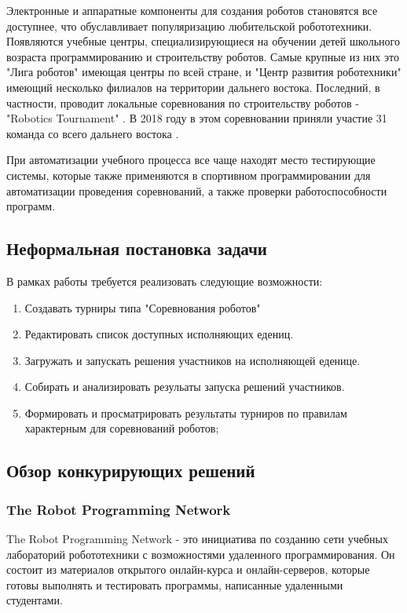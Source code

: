 \documentclass[a4paper,12pt]{article}
\begin{document}
Электронные и аппаратные компоненты для создания роботов становятся все доступнее, что обуславливает популяризацию любительской робототехники. Появляются учебные центры, специализирующиеся на обучении детей школьного возраста программированию и строительству роботов. Самые крупные из них это "Лига роботов" \cite{web:ligarobotov} имеющая центры по всей стране, и "Центр развития роботехники" \cite{web:robocentr} имеющий несколько филиалов на территории дальнего востока. Последний, в частности, проводит локальные соревнования по строительству роботов - "Robotics Tournament" \cite{web:robotournament}. В 2018 году в этом соревновании приняли участие 31 команда со всего дальнего востока \cite{web:robotournament-finals}.

При автоматизации учебного процесса все чаще находят место тестирующие системы, которые также применяются в спортивном программировании для автоматизации проведения соревнований, а также проверки работоспособности программ.

\subsection{Неформальная постановка задачи}
В рамках работы требуется реализовать следующие возможности:
\begin{enumerate}
    \item Создавать турниры типа "Соревнования роботов"
    \item Редактировать список доступных исполняющих едениц.
    \item Загружать и запускать решения участников на исполняющей еденице.
    \item Собирать и анализировать резульаты запуска решений участников.
    \item Формировать и просматрировать результаты турниров по правилам характерным для соревнований роботов;
\end{enumerate}

\subsection{Обзор конкурирующих решений}
\subsubsection{The Robot Programming Network}
The Robot Programming Network - это инициатива по созданию сети учебных лабораторий робототехники с возможностями удаленного программирования. Он состоит из материалов открытого онлайн-курса и онлайн-серверов, которые готовы выполнять и тестировать программы, написанные удаленными студентами. 
\end{document}
